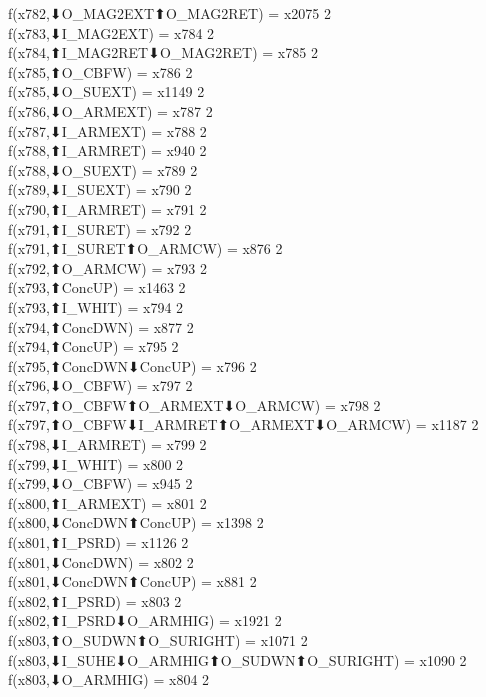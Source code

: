 f(x782,⬇O_MAG2EXT⬆O_MAG2RET) = x2075 {2} \\
f(x783,⬇I_MAG2EXT) = x784 {2} \\
f(x784,⬆I_MAG2RET⬇O_MAG2RET) = x785 {2} \\
f(x785,⬆O_CBFW) = x786 {2} \\
f(x785,⬇O_SUEXT) = x1149 {2} \\
f(x786,⬇O_ARMEXT) = x787 {2} \\
f(x787,⬇I_ARMEXT) = x788 {2} \\
f(x788,⬆I_ARMRET) = x940 {2} \\
f(x788,⬇O_SUEXT) = x789 {2} \\
f(x789,⬇I_SUEXT) = x790 {2} \\
f(x790,⬆I_ARMRET) = x791 {2} \\
f(x791,⬆I_SURET) = x792 {2} \\
f(x791,⬆I_SURET⬆O_ARMCW) = x876 {2} \\
f(x792,⬆O_ARMCW) = x793 {2} \\
f(x793,⬆ConcUP) = x1463 {2} \\
f(x793,⬆I_WHIT) = x794 {2} \\
f(x794,⬆ConcDWN) = x877 {2} \\
f(x794,⬆ConcUP) = x795 {2} \\
f(x795,⬆ConcDWN⬇ConcUP) = x796 {2} \\
f(x796,⬇O_CBFW) = x797 {2} \\
f(x797,⬆O_CBFW⬆O_ARMEXT⬇O_ARMCW) = x798 {2} \\
f(x797,⬆O_CBFW⬇I_ARMRET⬆O_ARMEXT⬇O_ARMCW) = x1187 {2} \\
f(x798,⬇I_ARMRET) = x799 {2} \\
f(x799,⬇I_WHIT) = x800 {2} \\
f(x799,⬇O_CBFW) = x945 {2} \\
f(x800,⬆I_ARMEXT) = x801 {2} \\
f(x800,⬇ConcDWN⬆ConcUP) = x1398 {2} \\
f(x801,⬆I_PSRD) = x1126 {2} \\
f(x801,⬇ConcDWN) = x802 {2} \\
f(x801,⬇ConcDWN⬆ConcUP) = x881 {2} \\
f(x802,⬆I_PSRD) = x803 {2} \\
f(x802,⬆I_PSRD⬇O_ARMHIG) = x1921 {2} \\
f(x803,⬆O_SUDWN⬆O_SURIGHT) = x1071 {2} \\
f(x803,⬇I_SUHE⬇O_ARMHIG⬆O_SUDWN⬆O_SURIGHT) = x1090 {2} \\
f(x803,⬇O_ARMHIG) = x804 {2} \\
